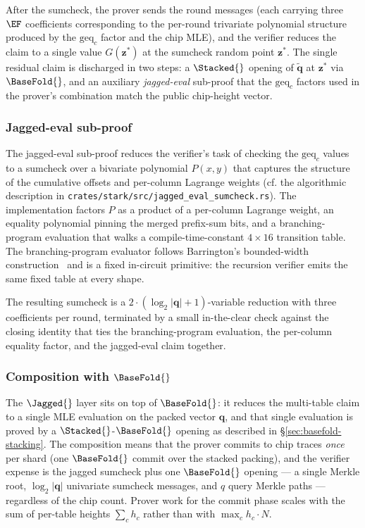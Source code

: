 After the sumcheck, the prover sends the round messages (each carrying three $\EF$ coefficients corresponding to the per-round trivariate polynomial structure produced by the $\mathrm{geq}_c$ factor and the chip MLE), and the verifier reduces the claim to a single value $G(\bm z^*)$ at the sumcheck random point $\bm z^*$. The single residual claim is discharged in two steps: a $\Stacked{}$ opening of $\widetilde{\mathbf q}$ at $\bm z^*$ via $\BaseFold{}$, and an auxiliary \emph{jagged-eval} sub-proof that the $\mathrm{geq}_c$ factors used in the prover's combination match the public chip-height vector.

\subsubsection{Jagged-eval sub-proof}

The jagged-eval sub-proof reduces the verifier's task of checking the $\mathrm{geq}_c$ values to a sumcheck over a bivariate polynomial $P(x, y)$ that captures the structure of the cumulative offsets and per-column Lagrange weights (cf. the algorithmic description in \texttt{crates/stark/src/jagged\_eval\_sumcheck.rs}). The implementation factors $P$ as a product of a per-column Lagrange weight, an equality polynomial pinning the merged prefix-sum bits, and a branching-program evaluation that walks a compile-time-constant $4\times 16$ transition table. The branching-program evaluator follows Barrington's bounded-width construction~\citep{barrington1989bounded} and is a fixed in-circuit primitive: the recursion verifier emits the same fixed table at every shape.

The resulting sumcheck is a $2 \cdot (\log_2|\mathbf q| + 1)$-variable reduction with three coefficients per round, terminated by a small in-the-clear check against the closing identity that ties the branching-program evaluation, the per-column equality factor, and the jagged-eval claim together.

\subsubsection{Composition with $\BaseFold{}$}

The $\Jagged{}$ layer sits on top of $\BaseFold{}$: it reduces the multi-table claim to a single MLE evaluation on the packed vector $\mathbf q$, and that single evaluation is proved by a $\Stacked{}$-$\BaseFold{}$ opening as described in \S\ref{sec:basefold-stacking}. The composition means that the prover commits to chip traces \emph{once} per shard (one $\BaseFold{}$ commit over the stacked packing), and the verifier expense is the jagged sumcheck plus one $\BaseFold{}$ opening — a single Merkle root, $\log_2|\mathbf q|$ univariate sumcheck messages, and $q$ query Merkle paths — regardless of the chip count. Prover work for the commit phase scales with the sum of per-table heights $\sum_c h_c$ rather than with $\max_c h_c \cdot N$.

